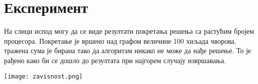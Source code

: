 \section{Експеримент}

На слици испод могу да се виде резултати покретања решења са растућим бројем процесора.
Покретање је вршено над графом величине 100 хиљада чворова, тражена сума је бирана тако да алгоритам никако не може да нађе решење.
То је рађено како би се дошло до резултата при најгорем случају извршавања.

\texttt{[image: zavisnost.png]}

\pagebreak